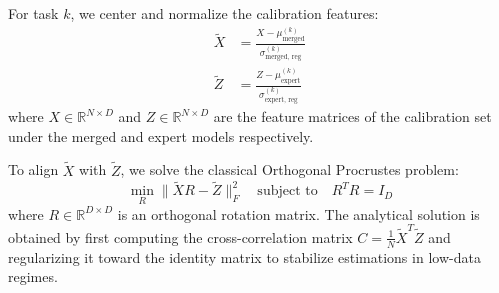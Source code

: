 \documentclass{article}
\theoremstyle{plain}
\theoremstyle{definition}
\theoremstyle{remark}
\begin{document}
For task $k$, we center and normalize the calibration features:
\begin{align}
\tilde{X} &= \frac{X - \mu_{\text{merged}}^{(k)}}{\sigma_{\text{merged, reg}}^{(k)}} \\
\tilde{Z} &= \frac{Z - \mu_{\text{expert}}^{(k)}}{\sigma_{\text{expert, reg}}^{(k)}}
\end{align}
where $X \in \mathbb{R}^{N \times D}$ and $Z \in \mathbb{R}^{N \times D}$ are the feature matrices of the calibration set under the merged and expert models respectively.

To align $\tilde{X}$ with $\tilde{Z}$, we solve the classical Orthogonal Procrustes problem:
\begin{equation}
\min_{R} \|\tilde{X} R - \tilde{Z}\|_F^2 \quad \text{subject to} \quad R^T R = I_D
\end{equation}
where $R \in \mathbb{R}^{D \times D}$ is an orthogonal rotation matrix. The analytical solution is obtained by first computing the cross-correlation matrix $C = \frac{1}{N}\tilde{X}^T \tilde{Z}$ and regularizing it toward the identity matrix to stabilize estimations in low-data regimes.
\end{document}
